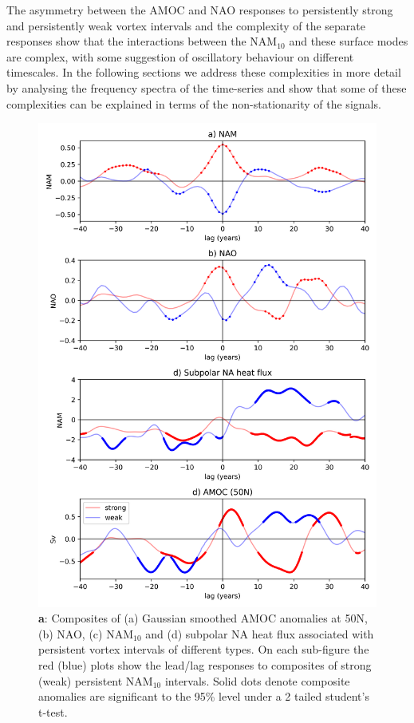 The asymmetry between the AMOC and NAO responses to persistently strong and persistently weak vortex intervals and the complexity of the separate responses show that the interactions between the NAM$_{10}$ and these surface modes are complex, with some suggestion of oscillatory behaviour on different timescales. In the following sections we address these complexities in more detail by analysing the frequency spectra of the time-series and show that some of these complexities can be explained in terms of the non-stationarity of the signals.

\begin{figure}[h!]
\begin{center}
\noindent\includegraphics[width =0.6\linewidth]{Figures/Figures-surface/AMOC_NAO_NAM_responses_each_event_type_final.png} 
\caption[AMOC, NAO and heat flux responses to strong and weak NAM$_{10}$ intervals]{\textbf{a}: Composites of (a) Gaussian smoothed AMOC anomalies at 50N, (b) NAO, (c) NAM$_{10}$ and (d) subpolar NA heat flux associated with persistent vortex intervals of different types. On each sub-figure the red (blue) plots show the lead/lag responses to composites of strong (weak) persistent NAM$_{10}$ intervals. Solid dots denote composite anomalies are significant to the 95\% level under a 2 tailed student's t-test.}
\label{NAO_AMOC_response_individual_types}
\end{center}
\end{figure}


